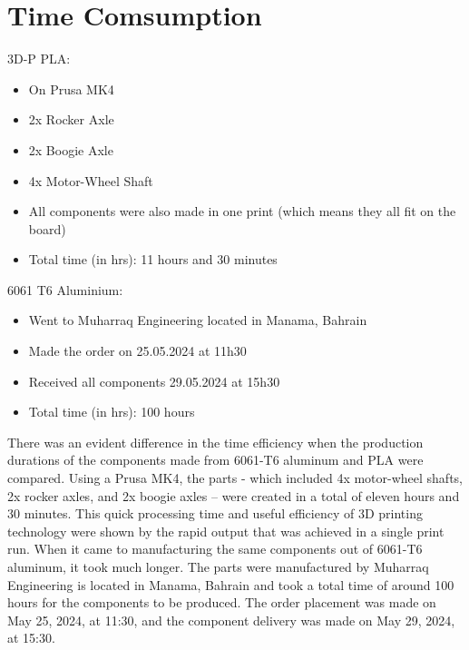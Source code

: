 \section{Time Comsumption}

    3D-P PLA:
    \begin{itemize}
        \item On Prusa MK4
        \item 2x Rocker Axle
        \item 2x Boogie Axle
        \item 4x Motor-Wheel Shaft
        \item All components were also made in one print (which means they all fit on the board)
        \item Total time (in hrs): 11 hours and 30 minutes
    \end{itemize}

    \newpage

    6061 T6 Aluminium:
    \begin{itemize}
        \item Went to Muharraq Engineering located in Manama, Bahrain
        \item Made the order on 25.05.2024 at 11h30
        \item Received all components 29.05.2024 at 15h30
        \item Total time (in hrs): 100 hours
    \end{itemize}

    There was an evident difference in the time efficiency when the production durations of the components
    made from 6061-T6 aluminum and PLA were compared. Using a Prusa MK4, the parts - which included
    4x motor-wheel shafts, 2x rocker axles, and 2x boogie axles – were created in a total of eleven hours
    and 30 minutes. This quick processing time and useful efficiency of 3D printing technology were shown by
    the rapid output that was achieved in a single print run. When it came to manufacturing the same
    components out of 6061-T6 aluminum, it took much longer. The parts were manufactured by Muharraq
    Engineering is located in Manama, Bahrain and took a total time of around 100 hours for the components to
    be produced. The order placement was made on May 25, 2024, at 11:30, and the component delivery was
    made on May 29, 2024, at 15:30.

